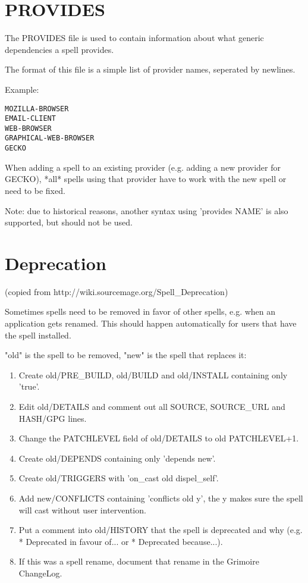 \documentclass[a4paper,10pt]{book}
\begin{document}
\section{PROVIDES}
The PROVIDES file is used to contain information about what generic
dependencies a spell provides.

The format of this file is a simple list of provider names, seperated by
newlines.

Example:
\begin{verbatim}
MOZILLA-BROWSER
EMAIL-CLIENT
WEB-BROWSER
GRAPHICAL-WEB-BROWSER
GECKO
\end{verbatim}

When adding a spell to an existing provider (e.g. adding a new provider for
GECKO), *all* spells using that provider have to work with the new spell or
need
to be fixed.

Note: due to historical reasons, another syntax using 'provides \textdollar
NAME' is also
supported, but should not be used.

\section{Deprecation}
(copied from http://wiki.sourcemage.org/Spell\_Deprecation)

Sometimes spells need to be removed in favor of other spells, e.g. when an
application gets renamed. This should happen automatically for users that
have the spell installed.

"old" is the spell to be removed, "new" is the spell that replaces it:
\begin{enumerate}
\item Create old/PRE\_BUILD, old/BUILD and old/INSTALL containing only
	'true'.
\item Edit old/DETAILS and comment out all SOURCE, SOURCE\_URL and HASH/GPG
	lines.
\item Change the PATCHLEVEL field of old/DETAILS to old PATCHLEVEL+1.
\item Create old/DEPENDS containing only 'depends new'.
\item Create old/TRIGGERS with 'on\_cast old dispel\_self'.
\item Add new/CONFLICTS containing 'conflicts old y', the y makes sure the
	spell will cast without user intervention.
\item Put a comment into old/HISTORY that the spell is deprecated and why
	(e.g. * Deprecated in favour of... or * Deprecated because...).
\item If this was a spell rename, document that rename in the Grimoire
	ChangeLog.
\end{enumerate}
\end{document}
